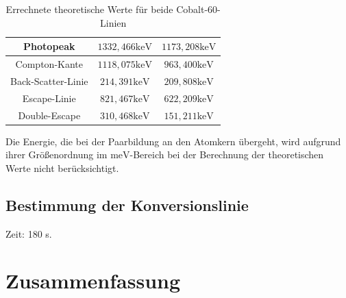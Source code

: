 \documentclass[
	parskip=half,10pt,
	numbers= noenddot, %
	toc=flat, %
	oneside,
	twocolumn,
	]{scrartcl}
\begin{document}
\begin{table}
\begin{tabular}{ccc}
Photopeak & $1332,466 \si{\kilo \electronvolt}$ & $1173,208 \si{\kilo \electronvolt}$ \\
 \hline 
Compton-Kante & $1118,075 \si{\kilo \electronvolt}$ &  $963,400 \si{\kilo \electronvolt}$\\
Back-Scatter-Linie &  $214,391 \si{\kilo \electronvolt}$ &  $209,808 \si{\kilo \electronvolt}$ \\
Escape-Linie & $821,467 \si{\kilo \electronvolt}$ & $622,209 \si{\kilo \electronvolt}$ \\
Double-Escape & $310,468 \si{\kilo \electronvolt}$ & $151,211 \si{\kilo \electronvolt}$
\end{tabular}
\caption{Errechnete theoretische Werte für beide Cobalt-60-Linien}
\label{tab:theo}
\end{table}

Die Energie, die bei der Paarbildung an den Atomkern übergeht, wird aufgrund ihrer Größenordnung im $\si{\milli \electronvolt}$-Bereich bei der Berechnung der 
theoretischen Werte nicht berücksichtigt. 

\subsection{Bestimmung der Konversionslinie}

Zeit: 180 s.



\section{Zusammenfassung}

\newpage


\end{document}
